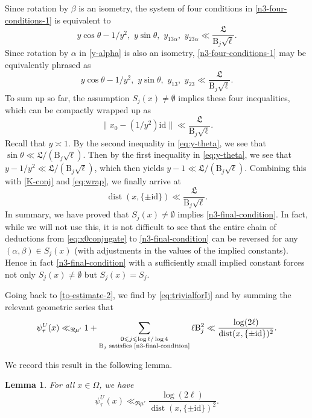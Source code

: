 \documentclass[11pt,oneside]{amsart}
\numberwithin{equation}{section}
\theoremstyle{remark}
\theoremstyle{plain}
\newtheorem{lemma}{Lemma}
\DeclareMathOperator{\dist}{dist}
\newcommand\id{\mathrm{id}}
\newcommand\BB{\mathrm{B}}
\renewcommand\leq{\leqslant}
\begin{document}
Since rotation by $\beta$ is an isometry, the system of four conditions in \eqref{n3-four-conditions-1} is equivalent to
\[ y\cos\theta-1/y^2,\,\,y\sin\theta,\,\,y_{13\alpha},\,\,y_{23\alpha}\ll\frac{\mathfrak{L}}{\BB_j\sqrt{\ell}}. \]
Since rotation by $\alpha$ in \eqref{y-alpha} is also an isometry, \eqref{n3-four-conditions-1} may be equivalently phrased as
\begin{equation}\label{eq:y-theta}
y\cos\theta-1/y^2,\,\,y\sin\theta,\,\,y_{13},\,\,y_{23}\ll\frac{\mathfrak{L}}{\BB_j\sqrt{\ell}}.
\end{equation}
To sum up so far, the assumption $S_j(x)\neq\emptyset$ implies these four inequalities, which can be compactly wrapped up as
\begin{equation}\label{eq:wrap}
\|x_0-(1/y^2)\id\|\ll\frac{\mathfrak{L}}{\BB_j\sqrt{\ell}}.
\end{equation}
Recall that $y\asymp 1$. By the second inequality in \eqref{eq:y-theta}, we see that $\sin\theta\ll \mathfrak{L}/(\BB_j\sqrt{\ell})$. Then by the first inequality in \eqref{eq:y-theta}, we see that $y-1/y^2\ll \mathfrak{L}/(\BB_j\sqrt{\ell})$, which then yields $y-1\ll \mathfrak{L}/(\BB_j\sqrt{\ell})$. Combining this with \eqref{K-conj} and \eqref{eq:wrap}, we finally arrive at
\begin{equation}
\label{n3-final-condition}
\dist(x,\{\pm\id\})\ll\frac{\mathfrak{L}}{\BB_j\sqrt{\ell}}.
\end{equation}
In summary, we have proved that $S_j(x)\neq\emptyset$ implies \eqref{n3-final-condition}. In fact, while we will not use this, it is not difficult to see that the entire chain of deductions from \eqref{eq:x0conjugate} to \eqref{n3-final-condition} can be reversed for any $(\alpha,\beta)\in S_j(x)$ (with adjustments in the values of the implied constants). Hence in fact \eqref{n3-final-condition} with a sufficiently small implied constant forces not only $S_j(x)\neq \emptyset$ but $S_j(x)=S_j$.

Going back to \eqref{to-estimate-2}, we find by \eqref{eq:trivialforIj} and by summing the relevant geometric series that
\begin{equation}\label{eq:geometric-series}
\psi_{\tau}^U(x)\ll_{\Re\mu'} 1 + \sum_{\substack{0\leq j\leq \log \ell / \log 4\\ \text{$\BB_j$ satisfies \eqref{n3-final-condition}}}}\ell\BB_j^2  \ll\frac{\log(2\ell)}{\dist(x,\{\pm\id\})^2}.
\end{equation}

We record this result in the following lemma.
\begin{lemma}\label{subsection52lemma}
For all $x\in\Omega$, we have
\[ \psi_{\tau}^U(x)\ll_{\Re\mu'}\frac{\log(2\ell)}{\dist(x,\{\pm\id\})^2}. \]
\end{lemma}
\end{document}
